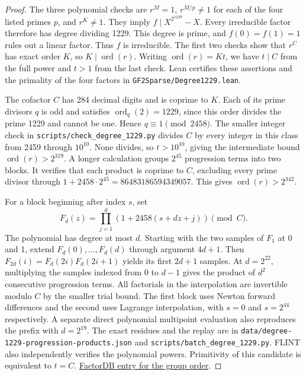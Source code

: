 \documentclass[11pt]{article}
\newcommand{\ord}{\operatorname{ord}}
\begin{document}
\begin{proof}
The three polynomial checks are \(r^M=1\), \(r^{M/p}\ne1\) for each
of the four listed primes \(p\), and \(r^K\ne1\). They imply
\(f\mid X^{2^{1229}}-X\). Every irreducible factor therefore has
degree dividing 1229. This degree is prime, and \(f(0)=f(1)=1\)
rules out a linear factor. Thus \(f\) is irreducible. The first two
checks show that \(r^C\) has exact order \(K\), so \(K\mid\ord(r)\).
Writing \(\ord(r)=Kt\), we have \(t\mid C\) from the full power
and \(t>1\) from the last check. Lean certifies these assertions
and the primality of the four factors in
\nolinkurl{GF2Sparse/Degree1229.lean}.

The cofactor \(C\) has 284 decimal digits and is coprime to \(K\).
Each of its prime divisors \(q\) is odd and satisfies
\(\ord_q(2)=1229\), since this order divides the prime 1229
and cannot be one. Hence \(q\equiv1\pmod{2458}\).
The smaller integer check in \nolinkurl{scripts/check_degree_1229.py} divides
\(C\) by every integer in this class from 2459 through \(10^{10}\).
None divides, so \(t>10^{10}\), giving the intermediate bound \(\ord(r)>2^{319}\).
A longer calculation groups \(2^{45}\) progression terms into two
blocks. It verifies that each product is coprime to \(C\), excluding
every prime divisor through \(1+2458\cdot2^{45}=86483186594349057\).
This gives \(\ord(r)>2^{342}\).

For a block beginning after index \(s\), set
\[
  F_d(z)=\prod_{j=1}^d(1+2458(s+dz+j))\pmod C .
\]
The polynomial has degree at most \(d\).
Starting with the two samples of \(F_1\) at 0 and 1, extend
\(F_d(0),\ldots,F_d(d)\) through argument \(4d+1\). Then
\(F_{2d}(i)=F_d(2i)F_d(2i+1)\) yields its first \(2d+1\)
samples. At \(d=2^{22}\), multiplying the samples indexed from 0 to
\(d-1\) gives the product of \(d^2\) consecutive progression
terms. All factorials in the interpolation are invertible modulo
\(C\) by the smaller trial bound. The first block uses Newton forward
differences and the second uses Lagrange interpolation, with
\(s=0\) and \(s=2^{44}\) respectively. A separate direct polynomial
multipoint evaluation also reproduces the prefix with \(d=2^{19}\).
The exact residues and the replay are in
\nolinkurl{data/degree-1229-progression-products.json} and
\nolinkurl{scripts/batch_degree_1229.py}.
FLINT also independently verifies the polynomial powers.
Primitivity of this candidate is equivalent to \(t=C\).
\href{https://factordb.com/index.php?query=2%5E1229-1}{FactorDB entry for the group order}.
\end{proof}
\end{document}
